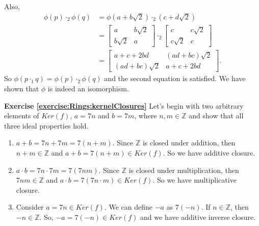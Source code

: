 Also, 
\begin{align*}
\phi(p)\cdot_2\phi(q)&=\phi(a+b\sqrt{2})\cdot_2(c+d\sqrt{2})\\
&=
\begin{bmatrix}
a & b \sqrt{2}\\
b \sqrt{2} & a
\end{bmatrix} \cdot_2
\begin{bmatrix}
c & c \sqrt{2}\\
c \sqrt{2} & c
\end{bmatrix}\\
&=
\begin{bmatrix}
a+c+2bd & (ad+bc) \sqrt{2}\\
(ad+bc) \sqrt{2} & a+c+2bd
\end{bmatrix}.
\end{align*}
So $\phi(p\cdot_1q)=\phi(p)\cdot_2\phi(q)$ and the second equation is satisfied.  We have shown that $\phi$ is indeed an isomorphism.


\noindent\textbf{Exercise \ref{exercise:Rings:kernelClosures}}
Let's begin with two arbitrary elements of $Ker(f)$, $a=7n$ and $b=7m$, where $n,m\in{\mathbb Z}$ and show that all three ideal properties hold.
\begin{enumerate}
\item $a+b=7n+7m=7(n+m)$.  Since ${\mathbb Z}$ is closed under addition, then $n+m\in{\mathbb Z}$ and $a+b=7(n+m)\in Ker(f)$.  So we have additive closure.
\item $a\cdot b=7n\cdot 7m=7(7nm)$.  Since ${\mathbb Z}$ is closed under multiplication, then $7nm\in{\mathbb Z}$ and $a\cdot b=7(7n\cdot m)\in Ker(f)$.  So we have multiplicative closure.
\item Consider $a=7n\in Ker(f)$.  We can define $-a$ as $7(-n)$.  If $n\in{\mathbb Z}$, then $-n\in{\mathbb Z}$.  So, $-a=7(-n)\in Ker(f)$ and we have additive inverse closure.
\end{enumerate}


